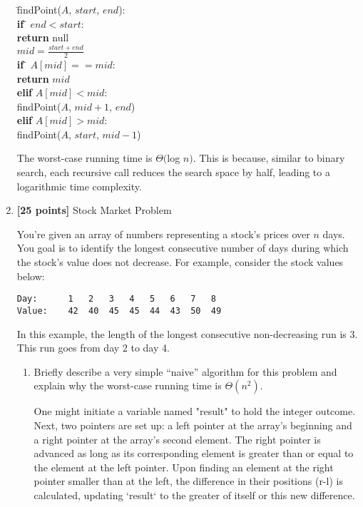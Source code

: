 \documentclass[11pt]{article}
\begin{document}
\begin{enumerate}
\begin{tabbing}
\hspace*{1cm} \= findPoint($A$, $start$, $end$): \\
\> \hspace*{.5cm} \= {\bf if} \= $end < start$: \\
\>\>\> {\bf return} null \\
\>\> $mid = \frac{start + end}{2}$ \\
\>\> {\bf if} \= $A[mid] == mid$: \\
\>\>\> {\bf return} $mid$ \\
\>\> {\bf elif} $A[mid] < mid$: \\
\>\>\> findPoint($A$, $mid+1$, $end$) \\
\>\> {\bf elif} $A[mid] > mid$: \\
\>\>\> findPoint($A$, $start$, $mid-1$) \\
\end{tabbing}

The worst-case running time is $\Theta($log $n)$. This is because, similar to binary search, each recursive call reduces the search space by half, leading to a logarithmic time complexity.


\pagebreak
\item \textbf{[25 points]} Stock Market Problem

  You're given an array of numbers representing a stock's prices over
  $n$ days.  You goal is to identify the longest consecutive number of
  days during which the stock's value does not decrease.  For example,
  consider the stock values below:
\begin{verbatim}
Day:      1   2   3   4   5   6   7   8
Value:    42  40  45  45  44  43  50  49
\end{verbatim}
In this example, the length of the longest consecutive non-decreasing 
run is 3.  This run goes from day 2 to day 4.  

\begin{enumerate}
\item Briefly describe 
  a very simple ``naive'' algorithm for this problem and explain
  why the worst-case running time is $\Theta(n^2)$.

One might initiate a variable named "result" to hold the integer outcome. Next, two pointers are set up: a left pointer at the array's beginning and a right pointer at the array's second element. The right pointer is advanced as long as its corresponding element is greater than or equal to the element at the left pointer. Upon finding an element at the right pointer smaller than at the left, the difference in their positions (r-l) is calculated, updating `result` to the greater of itself or this new difference.


\end{enumerate}
\end{enumerate}
\end{document}
